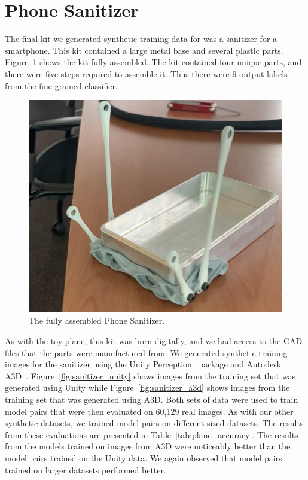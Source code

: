 \section{Phone Sanitizer}

The final kit we generated synthetic training data for was a sanitizer for a
smartphone.
This kit contained a large metal base and several plastic parts.
Figure~\ref{fig:full_sanitizer} shows the kit fully assembled.
The kit contained four unique parts, and there were five steps required to
assemble it.
Thus there were 9 output labels from the fine-grained classifier.

\begin{figure}
  \includegraphics[width=\columnwidth]{figures/synthetic/full_sanitizer.jpg}
  \caption{
    The fully assembled Phone Sanitizer.
  }\label{fig:full_sanitizer}
\end{figure}

As with the toy plane, this kit was born digitally, and we had access to the
CAD files that the parts were manufactured from.
We generated synthetic training images for the sanitizer using the Unity
Perception~\cite{unity} package and Autodesk A3D~\cite{Wang_2022_CVPR}.
Figure~\ref{fig:sanitizer_unity} shows images from the training set that was
generated using Unity while Figure~\ref{fig:sanitizer_a3d}
shows images from the training set that was generated using
A3D.
Both sets of data were used to train model pairs that were then evaluated on
60,129 real images.
As with our other synthetic datasets, we trained model pairs on different sized
datasets.
The results from these evaluations are presented in
Table~\ref{tab:plane_accuracy}.
The results from the models trained on images from A3D were noticeably better
than the model pairs trained on the Unity data.
We again observed that model pairs trained on larger datasets performed better.

